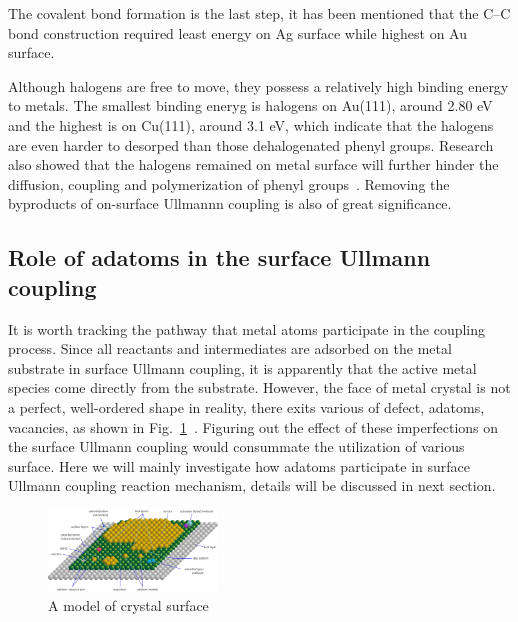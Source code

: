 \documentclass[%
 reprint,
 amsmath,amssymb,
 aps,
prb,
]{revtex4-2}
\begin{document}
The covalent bond formation is the last step, it has been mentioned that the C--C bond construction required least energy on Ag surface while highest on Au surface.  

Although halogens are free to move, they possess a relatively high binding energy to metals. The smallest binding eneryg is halogens on Au(111), around 2.80 eV and the highest is on Cu(111), around 3.1 eV, which indicate that the halogens are even harder to desorped than those dehalogenated phenyl groups. Research also showed that the halogens remained on metal surface will further hinder the diffusion, coupling and polymerization of phenyl groups~\cite{ullmann_64,ullmann_65}. Removing the byproducts of on-surface Ullmannn coupling is also of great significance.

\subsection{Role of adatoms in the surface Ullmann coupling} 

It is worth tracking the pathway that metal atoms participate in the coupling process. Since all reactants and intermediates are adsorbed on the metal substrate in surface Ullmann coupling, it is apparently that the active metal species come directly from the substrate. However, the face of metal crystal is not a perfect, well-ordered shape in reality, there exits various of defect, adatoms, vacancies, as shown in Fig.~\ref{cyrstal_surface}~\cite{ullmann_49}. Figuring out the effect of these imperfections on the surface Ullmann coupling would consummate the utilization of various surface. Here we will mainly investigate how adatoms participate in surface Ullmann coupling reaction mechanism, details will be discussed in next section.

\begin{figure}[htb]
\centering
\includegraphics[width=0.4\textwidth]{Fig/Crystal_surface.jpg}
\caption{A model of crystal surface}
\label{cyrstal_surface}
\end{figure}
\end{document}
